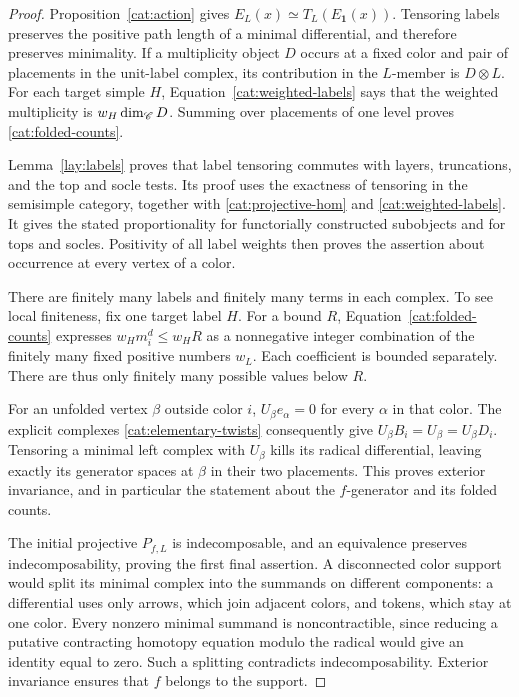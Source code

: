 \begin{proof}
Proposition~\ref{cat:action} gives
$E_L(x)\simeq T_L(E_{\mathbf1}(x))$.  Tensoring labels preserves
the positive path length of a minimal differential, and therefore
preserves minimality.  If a multiplicity object $D$ occurs at a
fixed color and pair of placements in the unit-label complex, its
contribution in the $L$-member is $D\otimes L$.  For each target
simple $H$, Equation~\eqref{cat:weighted-labels} says that the
weighted multiplicity is $w_H\dim_{\mathscr C}D$.  Summing over placements
of one level proves \eqref{cat:folded-counts}.

Lemma~\ref{lay:labels} proves that label tensoring commutes with
layers, truncations, and the top and socle tests.  Its proof uses
the exactness of tensoring in the semisimple category, together
with \eqref{cat:projective-hom} and
\eqref{cat:weighted-labels}.  It gives the stated proportionality
for functorially constructed subobjects and for tops and socles.
Positivity of all label weights then proves the assertion about
occurrence at every vertex of a color.

There are finitely many labels and finitely many terms in each
complex.  To see local finiteness, fix one target label $H$.
For a bound $R$, Equation~\eqref{cat:folded-counts} expresses
$w_Hm_i^d\leq w_HR$ as a nonnegative integer combination of the
finitely many fixed positive numbers $w_L$.  Each coefficient is
bounded separately.  There are thus only finitely many possible
values below $R$.

For an unfolded vertex $\beta$ outside color $i$,
$U_\beta e_\alpha=0$ for every $\alpha$ in that color.  The
explicit complexes \eqref{cat:elementary-twists} consequently give
$U_\beta B_i=U_\beta=U_\beta D_i$.  Tensoring a minimal left
complex with $U_\beta$ kills its radical differential, leaving
exactly its generator spaces at $\beta$ in their two placements.
This proves exterior invariance, and in particular the statement
about the $f$-generator and its folded counts.

The initial projective $P_{f,L}$ is indecomposable, and an
equivalence preserves indecomposability, proving the first final
assertion.  A disconnected color support would split its minimal
complex into the summands on different components: a differential
uses only arrows, which join adjacent colors, and tokens, which
stay at one color.  Every nonzero minimal summand is
noncontractible, since reducing a putative contracting homotopy
equation modulo the radical would give an identity equal to zero.
Such a splitting contradicts indecomposability.  Exterior
invariance ensures that $f$ belongs to the support.
\end{proof}

